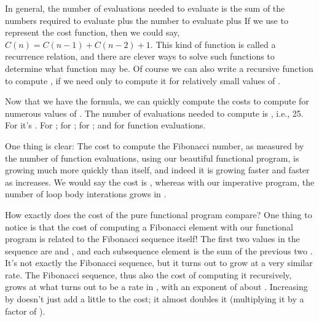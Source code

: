\documentclass[letterpaper,10pt,english]{sphinxmanual}
\begin{document}
In general, the number of evaluations needed to evaluate  is
the sum of the numbers required to evaluate  plus the number
to evaluate  plus  If we use  to represent the cost
function, then we could say, \(C(n) = C(n-1) + C(n-2) + 1\). This
kind of function is called a recurrence relation, and there are clever
ways to solve such functions to determine what function  may be. Of
course we can also write a recursive function to compute , if
we need only to compute it for relatively small values of .

Now that we have the formula, we can quickly compute the costs to
compute  for numerous values of . The number of evaluations
needed to compute  is , i.e., 25. For 
it’s .  For ; for ; for ;
and for  function evaluations.

One thing is clear: The cost to compute the  Fibonacci number,
as measured by the number of function evaluations, using our beautiful
functional program, is growing much more quickly than  itself, and
indeed it is growing faster and faster as  increases. We would say
the cost is , whereas with our imperative program, the
number of loop body interations grows  in .

How exactly does the cost of the pure functional program compare? One
thing to notice is that the cost of computing a Fibonacci element with
our functional program is related to the Fibonacci sequence itself!
The first two values in the  sequence are  and , and each
subsequence element is the sum of the previous two .  It’s not
exactly the Fibonacci sequence, but it turns out to grow at a very
similar rate. The Fibonacci sequence, thus also the cost of computing
it recursively, grows at what turns out to be a rate  in
, with an exponent of about . Increasing  by  doesn’t
just add a little to the cost; it almost doubles it (multiplying it by
a factor of ).
\end{document}

